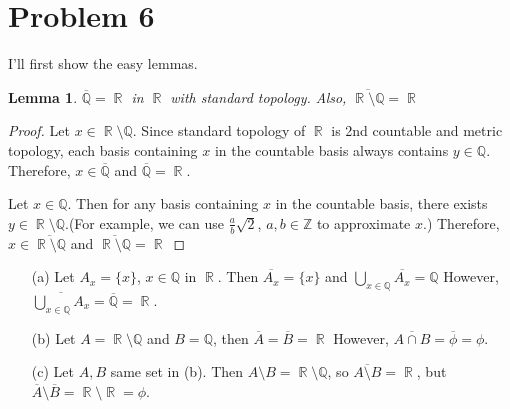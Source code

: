\documentclass{article}
\DeclareMathOperator{\rr}{\mathbb{R}}
\newtheorem{lemma}{Lemma}
\begin{document}
\section*{Problem 6}
I'll first show the easy lemmas.
\begin{lemma}
$\overline{\mathbb{Q}}=\rr$ in $\rr$ with standard topology. Also, $\overline{\rr\setminus\mathbb{Q}}=\rr$
\end{lemma}
\begin{proof}
Let $x\in \rr\setminus\mathbb{Q}$. Since standard topology of $\rr$ is 2nd countable and metric topology, each basis containing $x$ in the countable basis always contains $y\in \mathbb{Q}$. Therefore, $x\in \overline{\mathbb{Q}}$ and $\overline{\mathbb{Q}}=\rr$.

Let $x\in \mathbb{Q}$. Then for any basis containing $x$ in the countable basis, there exists $y\in \rr\setminus\mathbb{Q}$.(For example, we can use $\frac{a}{b}\sqrt{2}$, $a,b\in \mathbb{Z}$ to approximate $x$.) Therefore, $x\in \overline{\rr\setminus\mathbb{Q}}$ and $\overline{\rr\setminus\mathbb{Q}}=\rr$
\end{proof}
\begin{enumerate}
\item[(a)] Let $A_x=\{x\}$, $x\in \mathbb{Q}$ in $\rr$. Then $\overline{A_x}=\{x\}$ and $\bigcup_{x\in \mathbb{Q}} \overline{A_x}=\mathbb{Q}$ However, $\overline{\bigcup_{x\in \mathbb{Q}} A_x}=\overline{\mathbb{Q}}=\rr$.
\item[(b)] Let $A=\rr\setminus\mathbb{Q}$ and $B=\mathbb{Q}$, then $\overline{A}=\overline{B}=\rr$ However, $\overline{A\cap B}=\overline{\phi}=\phi$.
\item[(c)] Let $A,B$ same set in (b). Then $A\setminus B=\rr\setminus\mathbb{Q}$, so $\overline{A\setminus B}=\rr$, but $\overline{A}\setminus\overline{B}=\rr\setminus\rr=\phi$.
\end{enumerate}
\end{document}
